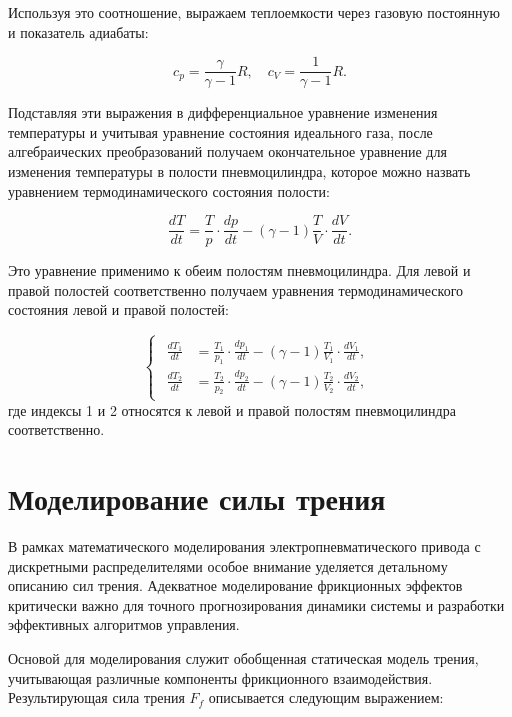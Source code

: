 Используя это соотношение, выражаем теплоемкости через газовую постоянную и показатель адиабаты:

\begin{equation*}
    c_p = \frac{\gamma}{\gamma - 1} R, \quad c_V = \frac{1}{\gamma - 1} R.
\end{equation*}

Подставляя эти выражения в дифференциальное уравнение изменения температуры и учитывая уравнение состояния идеального газа, после алгебраических преобразований получаем окончательное уравнение для изменения температуры в полости пневмоцилиндра, которое можно назвать уравнением термодинамического состояния полости:

\begin{equation*}
    \frac{dT}{dt} = \frac{T}{p} \cdot \frac{dp}{dt} - (\gamma - 1) \frac{T}{V} \cdot \frac{dV}{dt}.
\end{equation*}

Это уравнение применимо к обеим полостям пневмоцилиндра. Для левой и правой полостей соответственно
получаем уравнения термодинамического состояния левой и правой полостей:

\begin{equation*}
    \begin{cases}
        \begin{aligned}
            \frac{dT_1}{dt} & = \frac{T_1}{p_1} \cdot \frac{dp_1}{dt} - (\gamma - 1) \frac{T_1}{V_1} \cdot \frac{dV_1}{dt}, \\
            \frac{dT_2}{dt} & = \frac{T_2}{p_2} \cdot \frac{dp_2}{dt} - (\gamma - 1) \frac{T_2}{V_2} \cdot \frac{dV_2}{dt},
        \end{aligned}
    \end{cases}
\end{equation*}
где индексы 1 и 2 относятся к левой и правой полостям пневмоцилиндра соответственно.



\section{Моделирование силы трения}\label{sec:ch2/sec2/subsec4}
В рамках математического моделирования электропневматического привода с
дискретными распределителями особое внимание уделяется детальному описанию сил трения.
Адекватное моделирование фрикционных эффектов критически важно для
точного прогнозирования динамики системы и разработки
эффективных алгоритмов управления.

Основой для моделирования служит обобщенная статическая модель трения,
учитывающая различные компоненты фрикционного взаимодействия.
Результирующая сила трения $F_f$ описывается следующим выражением:

